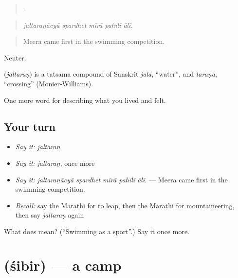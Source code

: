 \begin{quote}
    .
\end{quote}

\begin{quote}
\emph{jaltaraṇācyā spardhet mīrā pahilī ālī.}
\end{quote}

\begin{quote}
Meera came first in the swimming competition.
\end{quote}

Neuter.

\begin{cousinweb}
\textbf{} (\emph{jaltaraṇ}) is a tatsama compound of Sanskrit \emph{jala}, \textquotedblleft{}water\textquotedblright{}, and \emph{taraṇa}, \textquotedblleft{}crossing\textquotedblright{} (Monier-Williams).
\end{cousinweb}

\begin{grammarlens}[title={What you've built}]
One more word for describing what you lived and felt.
\end{grammarlens}

\subsection*{Your turn}
\begin{itemize}
\raggedright
  \item \emph{Say it:} \emph{jaltaraṇ}
  \item \emph{Say it:} \emph{jaltaraṇ}, once more
  \item \emph{Say it:} \emph{jaltaraṇācyā spardhet mīrā pahilī ālī.} — Meera came first in the swimming competition.
  \item \emph{Recall:} say the Marathi for to leap, then the Marathi for mountaineering, then say \emph{jaltaraṇ} again
\end{itemize}

\begin{tcolorbox}[breakable,colback=teal!4,colframe=teal!35!black,title={Before you move on}]
What does  mean? (\textquotedblleft{}Swimming as a sport\textquotedblright{}.) Say it once more.
\end{tcolorbox}
\section[\texorpdfstring{\mr{शिबिर} (śibir)}{शिबिर (śibir)}]{ (śibir) — a camp}

